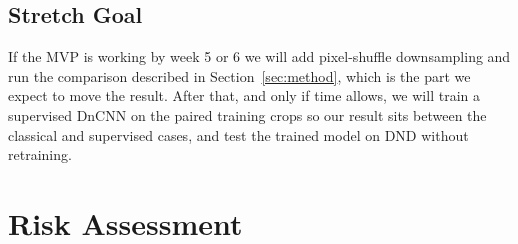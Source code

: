 \documentclass[11pt]{article}
\begin{document}
\subsection{Stretch Goal}
If the MVP is working by week 5 or 6 we will add pixel-shuffle downsampling and run the
comparison described in Section~\ref{sec:method}, which is the part we expect to move the
result. After that, and only if time allows, we will train a supervised DnCNN
\citep{zhang2017dncnn} on the paired training crops so our result sits between the
classical and supervised cases, and test the trained model on DND \citep{plotz2017dnd}
without retraining.

\section{Risk Assessment}
\label{sec:risk}
\end{document}
